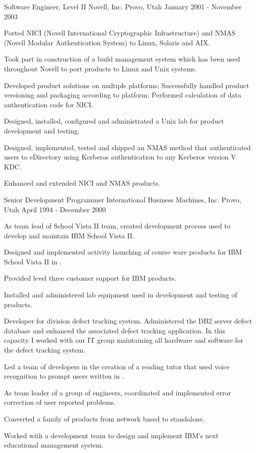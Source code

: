 \cventry
{Software Engineer, Level II} %
{Novell, Inc.} %
{Provo, Utah} %
{January 2001 - November 2003} %
{
	\begin{cvitems} %
		\item {Ported NICI (Novell International Cryptographic Infrastructure) and NMAS (Novell Modular Authentication System) to Linux, Solaris and AIX.}
		\item {Took part in construction of a build management system which has been used throughout Novell to port products to Linux and Unix systems.}
		\item {Developed product solutions on multiple platforms; Successfully handled product versioning and packaging according to platform; Performed calculation of data authentication code for NICI.}
		\item {Designed, installed, configured and administrated a Unix lab for product development and testing.}
		\item {Designed, implemented, tested and shipped an NMAS method that authenticated users to eDirectory using Kerberos authentication to any Kerberos version V KDC.}
		\item {Enhanced and extended NICI and NMAS products.}
	\end{cvitems}
}

\cventry
{Senior Development Programmer} %
{International Business Machines, Inc.} %
{Provo, Utah} %
{April 1994 - December 2000} %
{
	\begin{cvitems} %
		\item {As team lead of School Vista II team, created development process used to develop and maintain IBM School Vista II.}
		\item {Designed and implemented activity launching of course ware products for IBM School Vista II in \Cpp{}.}
		\item {Provided level three customer support for IBM products.}
		\item {Installed and administered lab equipment used in development and testing of products.}
		\item {Developer for division defect tracking system. Administered the DB2 server defect database and enhanced the associated defect tracking application. In this capacity I worked with our IT group maintaining all hardware and software for the defect tracking system.}
		\item {Led a team of developers in the creation of a reading tutor that used voice recognition to prompt users written in \Cpp{}.}
		\item {As team leader of a group of engineers, coordinated and implemented error correction of user reported problems.}
		\item {Converted a family of products from network based to standalone.}
		\item {Worked with a development team to design and implement IBM's next educational management system.}
	\end{cvitems}
}
